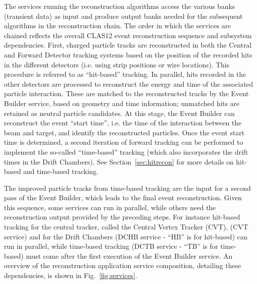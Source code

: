 The services running the reconstruction algorithms access the various banks (transient data) as input and produce
output banks needed for the subsequent algorithms in the reconstruction chain. The order in which the services are
chained reflects the overall CLAS12 event reconstruction sequence and subsystem dependencies. First, charged
particle tracks are reconstructed in both the Central and Forward Detector tracking systems based on the position
of the recorded hits in the different detectors (i.e. using strip positions or wire locations). This procedure is
referred to as ``hit-based'' tracking. In parallel, hits recorded in the other detectors are processed to reconstruct
the energy and time of the associated particle interaction. These are matched to the reconstructed tracks by the
Event Builder service, based on geometry and time information; unmatched hits are retained as neutral particle
candidates. At this stage, the Event Builder can reconstruct the event ``start time'', i.e. the time of the interaction
between the beam and target, and identify the reconstructed particles. Once the event start time is determined, a
second iteration of forward tracking can be performed to implement the so-called ``time-based'' tracking (which
also incorporates the drift times in the Drift Chambers). See Section~\ref{sec:hitrecon} for more details on
hit-based and time-based tracking.

The improved particle tracks from time-based tracking are the input for a second pass of the Event Builder, which
leads to the final event reconstruction. Given this sequence, some services can run in parallel, while others need the
reconstruction output provided by the preceding steps. For instance hit-based tracking for the central tracker, called
the Central Vertex Tracker (CVT), (CVT service) and for the Drift Chambers (DCHB service - ``HB'' is for
hit-based) can run in parallel, while time-based tracking (DCTB service - ``TB'' is for time-based) must come after
the first execution of the Event Builder service. An overview of the reconstruction application service composition,
detailing these dependencies, is shown in Fig.~\ref{fig:services}.
